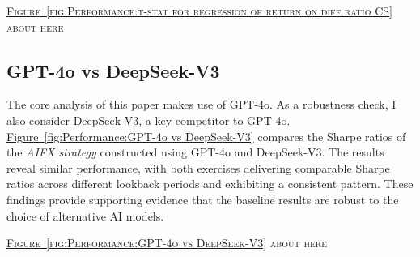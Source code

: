 \documentclass[12pt,oneside,letter]{article}
\newcommand*{\myfig}[1]{\hyperref[{#1}]{Figure~\ref*{#1}}}
\begin{document}
		\begin{center}
			\textsc{\myfig{fig:Performance:t-stat for regression of return on diff ratio CS} about here}  
		\end{center}
	
		\subsection{GPT-4o vs DeepSeek-V3}
		The core analysis of this paper makes use of GPT-4o. As a robustness check, I also consider DeepSeek-V3, a key competitor to GPT-4o. \myfig{fig:Performance:GPT-4o vs DeepSeek-V3} compares the Sharpe ratios of the \textit{AIFX strategy} constructed using GPT-4o and DeepSeek-V3. The results reveal similar performance, with both exercises delivering comparable Sharpe ratios across different lookback periods and exhibiting a consistent pattern. These findings provide supporting evidence that the baseline results are robust to the choice of alternative AI models. 
		\begin{center}
			\textsc{\myfig{fig:Performance:GPT-4o vs DeepSeek-V3} about here}  
		\end{center}
		
\end{document}
